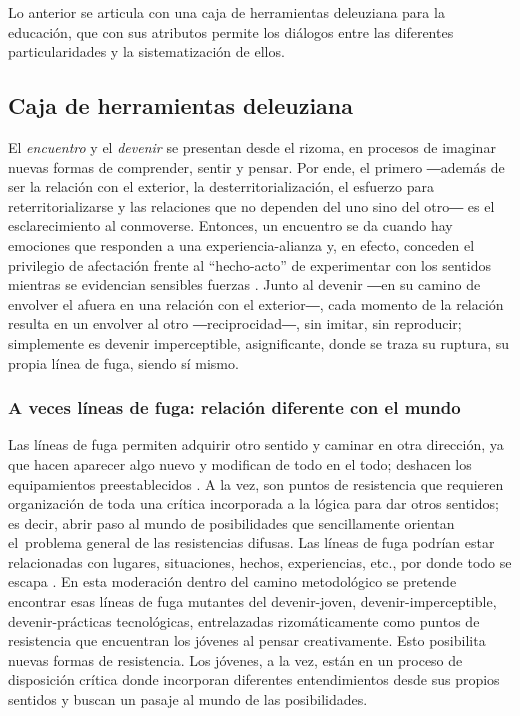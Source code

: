 \documentclass{textolivre}
\begin{document}
Lo anterior se articula con una caja de herramientas deleuziana para la educación, que con sus atributos permite los diálogos entre las diferentes particularidades y la sistematización de ellos.

\subsection{Caja de herramientas deleuziana}\label{sec-caja}
El \textit{encuentro} y el \textit{devenir} se presentan desde el rizoma, en procesos de imaginar nuevas formas de comprender, sentir y pensar. Por ende, el primero ―además de ser la relación con el exterior, la desterritorialización, el esfuerzo para reterritorializarse y las relaciones que no dependen del uno sino del otro― es el esclarecimiento al conmoverse. Entonces, un encuentro se da cuando hay emociones que responden a una experiencia-alianza y, en efecto, conceden el privilegio de afectación frente al “hecho-acto” de experimentar con los sentidos mientras se evidencian sensibles fuerzas \cite{deleuze_dialogos._2004}. Junto al devenir ―en su camino de envolver el afuera en una relación con el exterior―, cada momento de la relación resulta en un envolver al otro ―reciprocidad―, sin imitar, sin reproducir; simplemente es devenir imperceptible, asignificante, donde se traza su ruptura, su propia línea de fuga, siendo sí mismo. 

\subsubsection{A veces líneas de fuga: relación diferente con el mundo}\label{sec-veces}
Las líneas de fuga permiten adquirir otro sentido y caminar en otra dirección, ya que hacen aparecer algo nuevo y modifican de todo en el todo; deshacen los equipamientos preestablecidos \cite{guattari_lineas_2013}. A la vez, son puntos de resistencia que requieren organización de toda una crítica incorporada a la lógica para dar otros sentidos; es decir, abrir paso al mundo de posibilidades que sencillamente orientan el problema general de las resistencias difusas. Las líneas de fuga podrían estar relacionadas con lugares, situaciones, hechos, experiencias, etc., por donde todo se escapa \cite{deleuze_que_2007}. En esta moderación dentro del camino metodológico se pretende encontrar esas líneas de fuga mutantes del devenir-joven, devenir-imperceptible, devenir-prácticas tecnológicas, entrelazadas rizomáticamente como puntos de resistencia que encuentran los jóvenes al pensar creativamente. Esto posibilita nuevas formas de resistencia. Los jóvenes, a la vez, están en un proceso de disposición crítica donde incorporan diferentes entendimientos desde sus propios sentidos y buscan un pasaje al mundo de las posibilidades.
\end{document}
